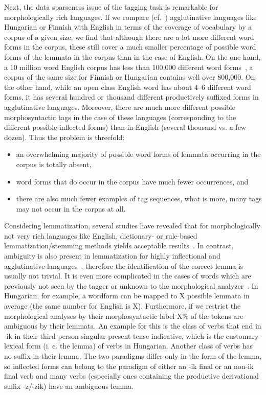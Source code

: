 Next, the data sparseness issue of the tagging task is remarkable for morphologically rich languages.
If we compare (cf.~\cite{}) agglutinative languages like Hungarian or Finnish with English in terms of the coverage of vocabulary by a corpus of a given size, we find that although there are a lot more different word forms in the corpus, these still cover a much smaller percentage of possible word forms of the lemmata in the corpus than in the case of English.
On the one hand, a 10 million word English corpus has less than 100,000 different word forms~\cite{}, a corpus of the same size for Finnish or Hungarian contains well over 800,000.
On the other hand, while an open class English word has about 4--6 different word forms, it has several hundred or thousand different productively suffixed forms in agglutinative languages.
Moreover, there are much more different possible morphosyntactic tags in the case of these languages (corresponding to the different possible inflected forms) than in English (several thousand vs. a few dozen).
Thus the problem is threefold:

\begin{itemize}
  \item an overwhelming majority of possible word forms of lemmata occurring in the corpus is totally absent,
  \item word forms that do occur in the corpus have much fewer occurrences, and
  \item there are also much fewer examples of tag sequences, what is more, many tags may not occur in the corpus at all.
\end{itemize}
Considering lemmatization, several studies have revealed that for morphologically not very rich languages like English, dictionary- or rule-based lemmatization/stemming methods yields acceptable results~\cite{}.
In contrast, ambiguity is also present in lemmatization for highly inflectional and agglutinative languages~\cite{Hajic,Szlovénok,Morfette}, therefore the identification of the correct lemma is usually not trivial.
It is even more complicated in the cases of words which are previously not seen by the tagger or unknown to the morphological analyzer~\cite{}.
In Hungarian, for example, a wordform can be mapped to X possible lemmata in average (the same number for English is X).
Furthermore, if we restrict the morphological analyses by their morphosyntactic label X\% of the tokens are ambiguous by their lemmata.
An example for this is the class of verbs that end in -ik in their third person singular present tense indicative, which is the customary lexical form (i. e. the lemma) of verbs in Hungarian.
Another class of verbs has no suffix in their lemma.
The two paradigms differ only in the form of the lemma, so inflected forms can belong to the paradigm of either an -ik final or an non-ik final verb and many verbs (especially ones containing the productive derivational suffix -z/-zik) have an ambiguous lemma.

